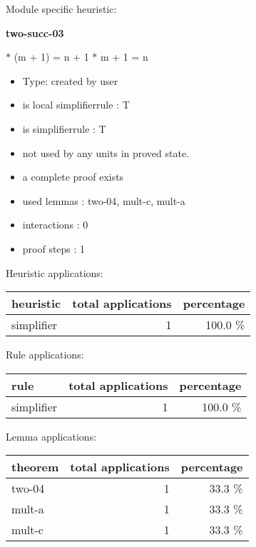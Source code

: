 \documentclass[a4paper]{article}
\begin{document}
Module specific heuristic:

\pagebreak

{\LARGE\bf two-succ-03}\label{lemma-two-succ-03}

\medskip

  $*$ (m + 1) = n + 1  $*$ m + 1 = n

\begin{itemize}

\item Type: created by user

\item is local simplifierrule : T
\item is simplifierrule : T
\item not used by any units in proved state.
\item       a complete proof exists
\item       used lemmas  : two-04, mult-c, mult-a
\item       interactions : 0
\item       proof steps  : 1
\end{itemize}

\medskip


Heuristic applications:

\begin{supertabular}{l|r|r}
heuristic	& total applications & percentage \\ \hline
simplifier & 1 & 100.0 \% \\

\end{supertabular}

Rule applications:

\begin{supertabular}{l|r|r}
rule	        & total applications & percentage \\ \hline
simplifier & 1 & 100.0 \% \\

\end{supertabular}

Lemma applications:

\begin{supertabular}{l|r|r}
theorem	        & total applications & percentage \\ \hline
two-04 & 1 & 33.3 \% \\
mult-a & 1 & 33.3 \% \\
mult-c & 1 & 33.3 \% \\

\end{supertabular}
\end{document}
